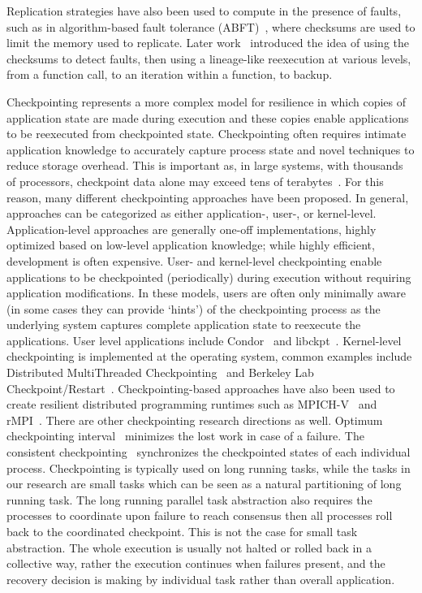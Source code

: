 \documentclass{sig-alternate}
\begin{document}
Replication strategies have also been used to compute in the presence of faults, such as in algorithm-based fault tolerance (ABFT)~\cite{abft}, where checksums are used to limit the memory used to replicate.  Later work~\cite{turmon1, turmon2, gunnels} introduced the idea of using the checksums to detect faults, then using a lineage-like reexecution at various levels, from a function call, to an iteration within a function, to backup.

Checkpointing represents a more complex model for resilience in which copies of application state are made during execution and these copies enable applications to be reexecuted from checkpointed state. Checkpointing often requires intimate application knowledge to accurately capture process state and novel techniques to reduce storage overhead. This is important as, in large systems, with thousands of processors, checkpoint data alone may exceed tens of terabytes~\cite{diskless2010}. For this reason, many different checkpointing approaches have been proposed. In general, approaches can be categorized as either application-, user-, or kernel-level. Application-level approaches are generally one-off implementations, highly optimized based on low-level application knowledge; while highly efficient, development is often expensive.
User- and kernel-level checkpointing enable applications to be checkpointed (periodically) during execution without requiring application modifications. In these models, users are often only minimally aware (in some cases they can provide `hints') of the checkpointing process as the underlying system captures complete application state to reexecute the applications. User level applications include Condor~\cite{condor1988} and libckpt~\cite{libckpt1994}. Kernel-level checkpointing is implemented at the operating system, common examples include Distributed MultiThreaded Checkpointing~\cite{dmtcp2009} and Berkeley Lab Checkpoint/Restart~\cite{blcr2006}. Checkpointing-based approaches have also been used to create resilient distributed programming runtimes such as MPICH-V~\cite{bosilca02mpichv} and rMPI~\cite{ferreira2011rmpi}.
There are other checkpointing research directions as well.
Optimum checkpointing interval~\cite{young1974first, daly2006higher} minimizes the lost work in case of a failure.
The consistent checkpointing~\cite{elnozahy1992performance, chandy1985distributed} synchronizes the checkpointed states of each individual process.
Checkpointing is typically used on long running tasks, while the tasks in our research are small tasks which can be seen as a natural partitioning of long running task. The long running parallel task abstraction also requires the processes to coordinate upon failure to reach consensus then all processes roll back to the coordinated checkpoint. This is not the case for small task abstraction. The whole execution is usually not halted or rolled back in a collective way, rather the execution continues when failures present, and the recovery decision is making by individual task rather than overall application.
 
\end{document}
